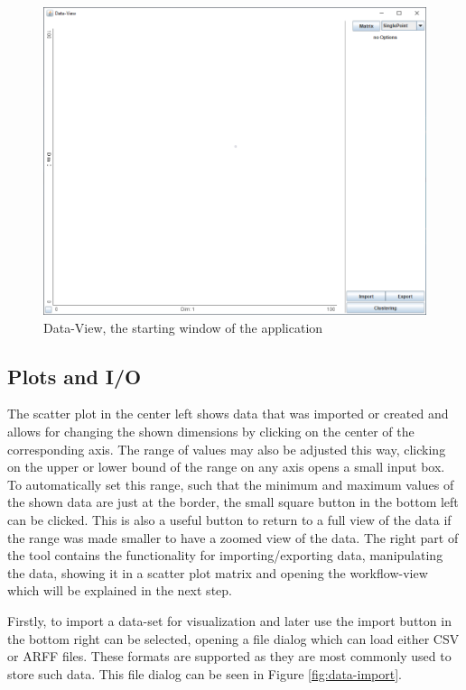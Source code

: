 \documentclass[
	a4paper,
	english,
	twoside,
	openright,               
	11pt                            
	]{report}
\begin{document}
\begin{figure}[h]
	\centering
	\includegraphics[scale=.45]{data-view}
	\caption{Data-View, the starting window of the application}
	\label{fig:data-view}
\end{figure}

\subsection{Plots and I/O}\label{sec:plotio}

The scatter plot in the center left shows data that was imported or created and allows for changing the shown dimensions by clicking on the center of the corresponding axis. The range of values may also be adjusted this way, clicking on the upper or lower bound of the range on any axis opens a small input box. To automatically set this range, such that the minimum and maximum values of the shown data are just at the border, the small square button in the bottom left can be clicked. This is also a useful button to return to a full view of the data if the range was made smaller to have a zoomed view of the data. The right part of the tool contains the functionality for importing/exporting data, manipulating the data, showing it in a scatter plot matrix and opening the workflow-view which will be explained in the next step.

 Firstly, to import a data-set for visualization and later use the import button in the bottom right can be selected, opening a file dialog which can load either CSV or ARFF files. These formats are supported as they are most commonly used to store such data. This file dialog can be seen in Figure \ref{fig:data-import}. 
\end{document}
